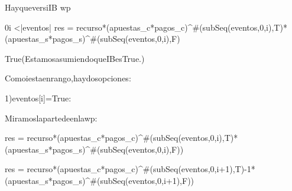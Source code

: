 {Hay\hspace{3}que\hspace{3}ver\hspace{3}si\hspace{3}I\wedge B \rightarrow wp
\vspace{0.6cm}

 0\leq i <|eventos| \wedge res = recurso*(apuestas_c*pagos_c)^{\#(subSeq(eventos,0,i),T)}*(apuestas_s*pagos_s)^{\#(subSeq(eventos,0,i),F)}
 \vspace{0.2cm}

\equiv True\hspace{6}(Estamos\hspace{3}asumiendo\hspace{3}que\hspace{3}I\wedge B\hspace{3}es\hspace{3}True.)
\vspace{0.4cm}

Como\hspace{3}i\hspace{3}esta\hspace{3}en\hspace{3}rango,\hspace{3}hay\hspace{3}dos\hspace{3}opciones:
\hspace{3}

1)eventos[i]=True:
\vspace{0.2cm}

Miramos\hspace{3}la\hspace{3}parte\hspace{3}de\hspace{3}\star\hspace{3}en\hspace{3}la\hspace{3}wp:
\vspace{0.4cm}

 res = recurso*(apuestas_c*pagos_c)^{\#(subSeq(eventos,0,i),T)}*(apuestas_s*pagos_s)^{\#(subSeq(eventos,0,i),F)})
\vspace{0.2cm}

\rightarrow res = recurso*(apuestas_c*pagos_c)^{\#(subSeq(eventos,0,i+1),T)-1}*(apuestas_s*pagos_s)^{\#(subSeq(eventos,0,i+1),F)})
\vspace{0.4cm}

}
